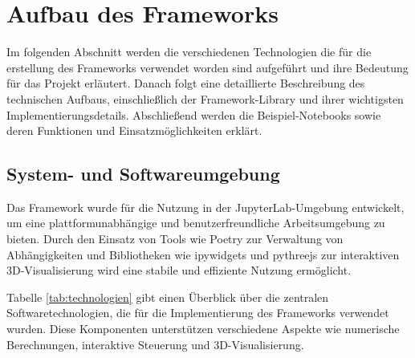\section{Aufbau des Frameworks}
Im folgenden Abschnitt werden die verschiedenen Technologien die für die erstellung des Frameworks verwendet worden sind
aufgeführt und ihre Bedeutung für das Projekt erläutert. Danach folgt eine detaillierte Beschreibung des technischen Aufbaus,
einschließlich der Framework-Library und ihrer wichtigsten Implementierungsdetails.
Abschließend werden die Beispiel-Notebooks sowie deren Funktionen und Einsatzmöglichkeiten erklärt.


\subsection{System- und Softwareumgebung}
Das Framework wurde für die Nutzung in der JupyterLab-Umgebung entwickelt, um eine plattformunabhängige und benutzerfreundliche Arbeitsumgebung zu bieten.
Durch den Einsatz von Tools wie Poetry zur Verwaltung von Abhängigkeiten und Bibliotheken wie ipywidgets und pythreejs zur
interaktiven 3D-Visualisierung wird eine stabile und effiziente Nutzung ermöglicht.


Tabelle \ref{tab:technologien} gibt einen Überblick über die zentralen Softwaretechnologien,
die für die Implementierung des Frameworks verwendet wurden. Diese Komponenten unterstützen verschiedene Aspekte wie numerische Berechnungen,
interaktive Steuerung und 3D-Visualisierung.

